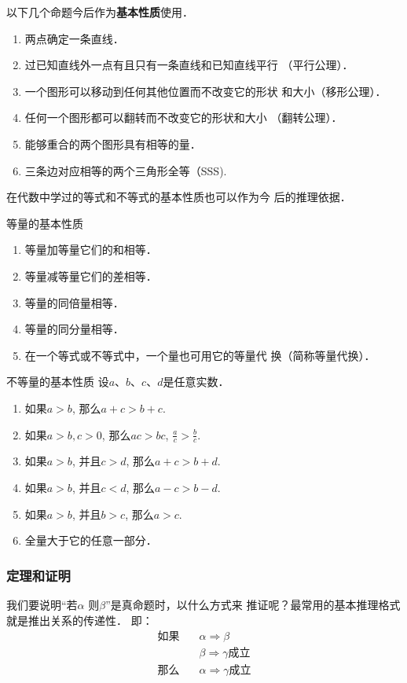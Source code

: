 以下几个命题今后作为\textbf{基本性质}使用．

\begin{enumerate}
\item 两点确定一条直线．
\item 过已知直线外一点有且只有一条直线和已知直线平行
（平行公理）．
\item 一个图形可以移动到任何其他位置而不改变它的形状
和大小（移形公理）．
\item 任何一个图形都可以翻转而不改变它的形状和大小
（翻转公理）．
\item 能够重合的两个图形具有相等的量．
\item  三条边对应相等的两个三角形全等（SSS).
\end{enumerate}

在代数中学过的等式和不等式的基本性质也可以作为今
后的推理依据．
\begin{blk}{等量的基本性质}
\begin{enumerate}
	\item 等量加等量它们的和相等．
	\item  等量减等量它们的差相等．
	\item 等量的同倍量相等．
	\item 等量的同分量相等．
	\item 在一个等式或不等式中，一个量也可用它的等量代
	换（简称等量代换）．
\end{enumerate}
\end{blk}

\begin{blk}{不等量的基本性质}
	设$a$、$b$、$c$、$d$是任意实数．
\begin{enumerate}
\item 如果$a>b$, 那么$a+c>b+c$.
\item 如果$a>b, c>0$, 那么$ac>bc$, $\frac{a}{c}>\frac{b}{c}$.
\item  如果$a>b$, 并且$c>d$, 那么$a+c>b+d$.
\item 如果$a>b$, 并且$c<d$, 那么$a-c>b-d$.
\item 如果$a>b$, 并且$b>c$, 那么$a>c$.
\item 全量大于它的任意一部分．
\end{enumerate}
\end{blk}

\subsubsection{定理和证明}
我们要说明“若$\alpha$ 则$\beta$”是真命题时，以什么方式来
推证呢？最常用的基本推理格式就是推出关系的传递性．
即：
\begin{align*}
	\text{如果}& \quad \alpha \Rightarrow \beta \tag{1}\\
	& \quad \beta \Rightarrow \gamma \text{成立} \tag{2}\\
\text{那么}&  \quad \alpha \Rightarrow \gamma \text{成立}\tag{3}
\end{align*}

